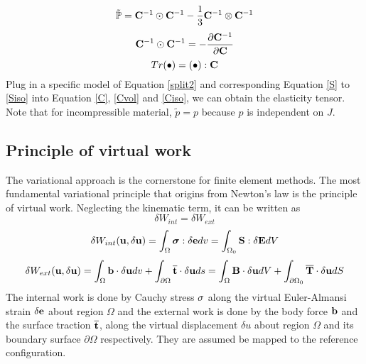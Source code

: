 \begin{equation}
\tilde{\mathbb{P}} = \bold{C}^{-1} \odot \bold{C}^{-1} -  \frac{1}{3}\bold{C}^{-1} \otimes \bold{C}^{-1} 
\end{equation}
\begin{equation}
\bold{C}^{-1}\odot\bold{C}^{-1} = - \frac{\partial{\bold{C}^{-1}}}{\partial{\bold{C}}}
\end{equation}
\begin{equation}
Tr(\bullet) = (\bullet) : \bold{C}
\end{equation}
Plug in a specific model of Equation \ref{split2} and corresponding Equation \ref{S} to \ref{Siso} into Equation \ref{C}, \ref{Cvol} and \ref{Ciso}, we can obtain the elasticity tensor. Note that for incompressible material, $\tilde{p} = p$ because $p$ is independent on $J$.
%
\subsection{Principle of virtual work}
The variational approach is the cornerstone for finite element methods. The most fundamental variational principle that origins from Newton's law is the principle of virtual work. Neglecting the kinematic term, it can be written as
\begin{equation} \label{basic}
\delta{W_{int}} = \delta{W_{ext}}
\end{equation}
\begin{equation} \label{Wint}
\delta W_{int}(\bold{u}, \delta\bold{u}) = \int_\Omega \boldsymbol\sigma : \delta\bold{e}dv = \int_{\Omega_{0}}\bold{S} : \delta\bold{E}dV
\end{equation}
\begin{equation} \label{Wext}
\delta W_{ext}(\bold{u}, \delta\bold{u}) = \int_\Omega\bold{b}\cdot\delta\bold{u}dv +  \int_{\partial\Omega}\overline{\bold{t}}\cdot\delta{\bold{u}}ds = \int_\Omega\bold{B}\cdot\delta\bold{u}dV +  \int_{\partial{\Omega_0}}\overline{\bold{T}}\cdot\delta{\bold{u}}dS
\end{equation}
The internal work is done by Cauchy stress $\bold\sigma$ along the virtual Euler-Almansi strain $\delta\bold{e}$ about region $\Omega$ and the external work is done by the body force $\bold{b}$ and the surface traction $\overline{\bold{t}}$, along the virtual displacement $\delta{u}$ about region $\Omega$ and its boundary surface $\partial\Omega$ respectively. They are assumed be mapped to the reference configuration. 

